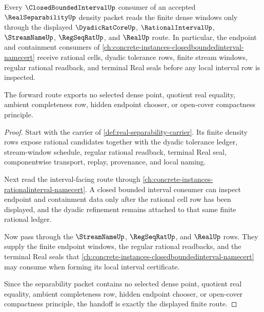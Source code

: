 \begin{theorem}
\label{thm:real-separability-closed-bounded-interval-forward-route}
Every $\ClosedBoundedIntervalUp$ consumer of an accepted $\RealSeparabilityUp$ density packet reads the finite dense windows only through the displayed $\DyadicRatCoreUp$, $\RationalIntervalUp$, $\StreamNameUp$, $\RegSeqRatUp$, and $\RealUp$ route. In particular, the endpoint and containment consumers of \autoref{ch:concrete-instances-closedboundedinterval-namecert} receive rational cells, dyadic tolerance rows, finite stream windows, regular rational readback, and terminal Real seals before any local interval row is inspected.

The forward route exports no selected dense point, quotient real equality, ambient completeness row, hidden endpoint chooser, or open-cover compactness principle.
\end{theorem}
\begin{proof}
Start with the carrier of \autoref{def:real-separability-carrier}. Its finite density rows expose rational candidates together with the dyadic tolerance ledger, stream-window schedule, regular rational readback, terminal Real seal, componentwise transport, replay, provenance, and local naming.

Next read the interval-facing route through \autoref{ch:concrete-instances-rationalinterval-namecert}. A closed bounded interval consumer can inspect endpoint and containment data only after the rational cell row has been displayed, and the dyadic refinement remains attached to that same finite rational ledger.

Now pass through the $\StreamNameUp$, $\RegSeqRatUp$, and $\RealUp$ rows. They supply the finite endpoint windows, the regular rational readbacks, and the terminal Real seals that \autoref{ch:concrete-instances-closedboundedinterval-namecert} may consume when forming its local interval certificate.

Since the separability packet contains no selected dense point, quotient real equality, ambient completeness row, hidden endpoint chooser, or open-cover compactness principle, the handoff is exactly the displayed finite route.
\end{proof}
